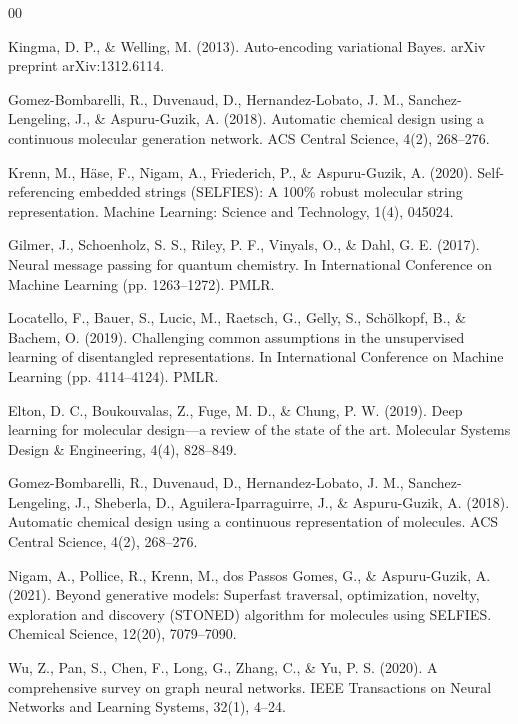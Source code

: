 \documentclass[conference]{IEEEtran}
\begin{document}
\begin{thebibliography}{00}

Kingma, D. P., \& Welling, M. (2013). Auto-encoding variational Bayes. arXiv preprint arXiv:1312.6114.

Gomez-Bombarelli, R., Duvenaud, D., Hernandez-Lobato, J. M., Sanchez-Lengeling, J., \& Aspuru-Guzik, A. (2018). Automatic chemical design using a continuous molecular generation network. ACS Central Science, 4(2), 268--276.

Krenn, M., Häse, F., Nigam, A., Friederich, P., \& Aspuru-Guzik, A. (2020). Self-referencing embedded strings (SELFIES): A 100\% robust molecular string representation. Machine Learning: Science and Technology, 1(4), 045024.

Gilmer, J., Schoenholz, S. S., Riley, P. F., Vinyals, O., \& Dahl, G. E. (2017). Neural message passing for quantum chemistry. In International Conference on Machine Learning (pp. 1263--1272). PMLR.

Locatello, F., Bauer, S., Lucic, M., Raetsch, G., Gelly, S., Schölkopf, B., \& Bachem, O. (2019). Challenging common assumptions in the unsupervised learning of disentangled representations. In International Conference on Machine Learning (pp. 4114--4124). PMLR.

Elton, D. C., Boukouvalas, Z., Fuge, M. D., \& Chung, P. W. (2019). Deep learning for molecular design---a review of the state of the art. Molecular Systems Design \& Engineering, 4(4), 828--849.

Gomez-Bombarelli, R., Duvenaud, D., Hernandez-Lobato, J. M., Sanchez-Lengeling, J., Sheberla, D., Aguilera-Iparraguirre, J., \& Aspuru-Guzik, A. (2018). Automatic chemical design using a continuous representation of molecules. ACS Central Science, 4(2), 268--276.

Nigam, A., Pollice, R., Krenn, M., dos Passos Gomes, G., \& Aspuru-Guzik, A. (2021). Beyond generative models: Superfast traversal, optimization, novelty, exploration and discovery (STONED) algorithm for molecules using SELFIES. Chemical Science, 12(20), 7079--7090.

Wu, Z., Pan, S., Chen, F., Long, G., Zhang, C., \& Yu, P. S. (2020). A comprehensive survey on graph neural networks. IEEE Transactions on Neural Networks and Learning Systems, 32(1), 4--24.


\end{thebibliography}
\end{document}
